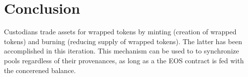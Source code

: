 \hypertarget{conclusion}{%
\section{Conclusion}\label{conclusion}}

Custodians trade assets for wrapped tokens by minting (creation of
wrapped tokens) and burning (reducing supply of wrapped tokens). The
latter has been accomplished in this iteration. This mechanism can be
used to to synchronize pools regardless of their provenances, as long as
a the EOS contract is fed with the concerened balance.
